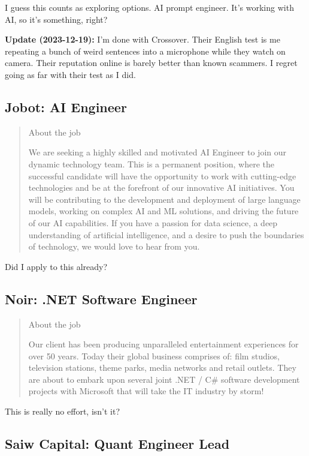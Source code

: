 \documentclass[
	letterpaper, %
	12pt, %
]{CSSullivanBusinessReport}
\begin{document}
I guess this counts as exploring options. AI prompt engineer. It's working with AI, so it's something, right?

\textbf{Update (2023-12-19):} I'm done with Crossover. Their English test is me repeating a bunch of weird sentences into a microphone while they watch on camera. Their reputation online is barely better than known scammers. I regret going as far with their test as I did. 

\subsection[Jobot]{Jobot: AI Engineer}

\begin{quote}
	About the job
	
	We are seeking a highly skilled and motivated AI Engineer to join our dynamic technology team. This is a permanent position, where the successful candidate will have the opportunity to work with cutting-edge technologies and be at the forefront of our innovative AI initiatives. You will be contributing to the development and deployment of large language models, working on complex AI and ML solutions, and driving the future of our AI capabilities. If you have a passion for data science, a deep understanding of artificial intelligence, and a desire to push the boundaries of technology, we would love to hear from you.

\end{quote}

Did I apply to this already?

\subsection[Noir]{Noir: .NET Software Engineer}

\begin{quote}
	About the job
	
	Our client has been producing unparalleled entertainment experiences for over 50 years. Today their global business comprises of: film studios, television stations, theme parks, media networks and retail outlets. They are about to embark upon several joint .NET / C\# software development projects with Microsoft that will take the IT industry by storm!

\end{quote}

This is really no effort, isn't it?

\subsection[Saiw Capital]{Saiw Capital: Quant Engineer Lead}
\end{document}
